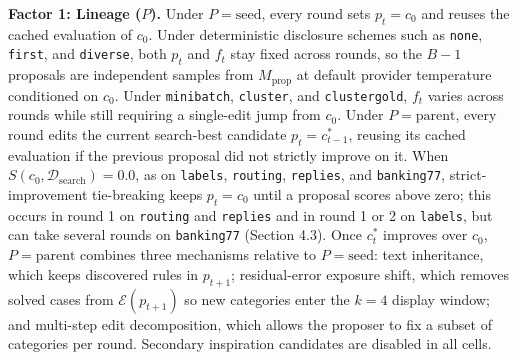 \documentclass[10pt]{article}
\begin{document}
\textbf{Factor 1: Lineage (\(P\)).} Under \(P = \text{seed}\), every
round sets \(p_t = c_0\) and reuses the cached evaluation of \(c_0\).
Under deterministic disclosure schemes such as \texttt{none},
\texttt{first}, and \texttt{diverse}, both \(p_t\) and \(f_t\) stay
fixed across rounds, so the \(B-1\) proposals are independent samples
from \(M_{\text{prop}}\) at default provider temperature conditioned on
\(c_0\). Under \texttt{minibatch}, \texttt{cluster}, and
\texttt{clustergold}, \(f_t\) varies across rounds while still requiring
a single-edit jump from \(c_0\). Under \(P = \text{parent}\), every
round edits the current search-best candidate \(p_t = c^*_{t-1}\),
reusing its cached evaluation if the previous proposal did not strictly
improve on it. When \(S(c_0, \mathcal{D}_{\text{search}}) = 0.0\), as on
\texttt{labels}, \texttt{routing}, \texttt{replies}, and
\texttt{banking77}, strict-improvement tie-breaking keeps \(p_t = c_0\)
until a proposal scores above zero; this occurs in round 1 on
\texttt{routing} and \texttt{replies} and in round 1 or 2 on
\texttt{labels}, but can take several rounds on \texttt{banking77}
(Section 4.3). Once \(c^*_t\) improves over \(c_0\),
\(P = \text{parent}\) combines three mechanisms relative to
\(P = \text{seed}\): text inheritance, which keeps discovered rules in
\(p_{t+1}\); residual-error exposure shift, which removes solved cases
from \(\mathcal{E}(p_{t+1})\) so new categories enter the \(k=4\)
display window; and multi-step edit decomposition, which allows the
proposer to fix a subset of categories per round. Secondary inspiration
candidates are disabled in all cells.
\end{document}
